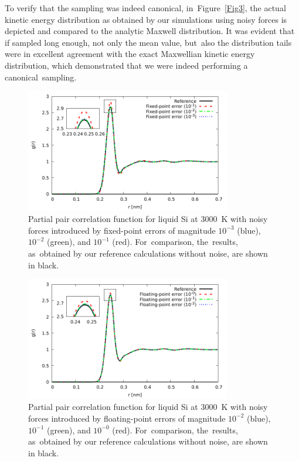 \documentclass[computation,article,accept,moreauthors,pdftex]{Definitions/mdpi}
\begin{document}
To verify that the sampling was indeed canonical, in~Figure~\ref{Fig3}, the actual kinetic energy distribution as obtained by our simulations using noisy forces is depicted and compared to the analytic Maxwell distribution. It was evident that if sampled long enough, not only the mean value, but~also the distribution tails were in excellent agreement with the exact Maxwellian kinetic energy distribution, which demonstrated that we were indeed performing a canonical~sampling.

\begin{figure}[H]
\begin{center}
\includegraphics[width=0.8\textwidth]
{Fixed_point_rdf2.pdf}
\end{center}
\caption{\label{Fig1}
Partial pair correlation function for liquid Si at 3000~K with noisy forces introduced by fixed-point errors of magnitude $10^{-3}$ (blue), $10^{-2}$ (green), and $10^{-1}$ (red). For~comparison, the~results, as~obtained by our reference calculations without noise, are shown in black.
} \end{figure}%
\begin{figure}[H]
\begin{center}
\includegraphics[width=0.8\textwidth]
{Floating_point_rdf2.pdf}
\end{center}
\caption{\label{Fig2}
Partial pair correlation function for liquid Si at 3000~K with noisy forces introduced by floating-point errors of magnitude $10^{-2}$ (blue), $10^{-1}$ (green), and $10^{-0}$ (red). For~comparison, the~results, as~obtained by our reference calculations without noise, are shown in black.
} \end{figure}
\end{document}
